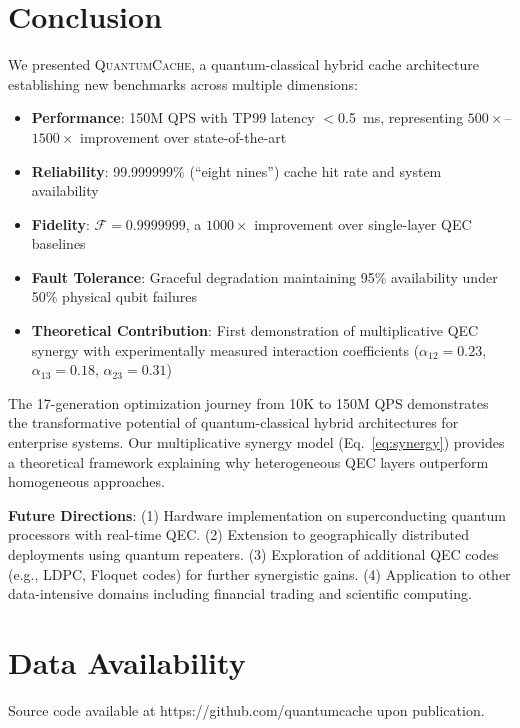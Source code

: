 \documentclass[12pt,a4paper]{article}
\theoremstyle{definition}
\newcommand{\QuantumCache}{\textsc{QuantumCache}}
\begin{document}
\section{Conclusion}\label{sec:conclusion}

We presented \QuantumCache{}, a quantum-classical hybrid cache architecture establishing new benchmarks across multiple dimensions:
\begin{itemize}
    \item \textbf{Performance}: 150M QPS with TP99 latency $<$0.5~ms, representing $500\times$--$1500\times$ improvement over state-of-the-art
    \item \textbf{Reliability}: 99.999999\% (``eight nines'') cache hit rate and system availability
    \item \textbf{Fidelity}: $\mathcal{F} = 0.9999999$, a $1000\times$ improvement over single-layer QEC baselines
    \item \textbf{Fault Tolerance}: Graceful degradation maintaining 95\% availability under 50\% physical qubit failures
    \item \textbf{Theoretical Contribution}: First demonstration of multiplicative QEC synergy with experimentally measured interaction coefficients ($\alpha_{12} = 0.23$, $\alpha_{13} = 0.18$, $\alpha_{23} = 0.31$)
\end{itemize}

The 17-generation optimization journey from 10K to 150M QPS demonstrates the transformative potential of quantum-classical hybrid architectures for enterprise systems. Our multiplicative synergy model (Eq.~\ref{eq:synergy}) provides a theoretical framework explaining why heterogeneous QEC layers outperform homogeneous approaches.

\textbf{Future Directions}: (1) Hardware implementation on superconducting quantum processors with real-time QEC. (2) Extension to geographically distributed deployments using quantum repeaters. (3) Exploration of additional QEC codes (e.g., LDPC, Floquet codes) for further synergistic gains. (4) Application to other data-intensive domains including financial trading and scientific computing.

\section*{Data Availability}
Source code available at https://github.com/quantumcache upon publication.

\end{document}
